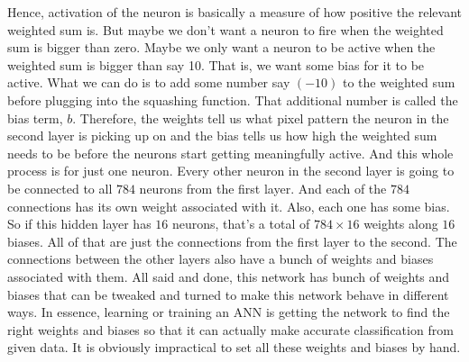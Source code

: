 \documentclass[master]{thesis-uestc}
\begin{document}
Hence, activation of the neuron is basically a measure of how positive the relevant weighted sum is. But maybe we don't want a neuron to fire when the weighted sum is bigger than zero. Maybe we only want a neuron to be active when the weighted sum is bigger than say 10. That is, we want some bias for it to be active. What we can do is to add some number say $(-10)$ to the weighted sum before plugging into the squashing function. That additional number is called the bias term, $b$. Therefore, the weights tell us what pixel pattern the neuron in the second layer is picking up on and the bias tells us how high the weighted sum needs to be before the neurons start getting meaningfully active. And this whole process is for just one neuron. Every other neuron in the second layer is going to be connected to all $784$ neurons from the first layer. And each of the $784$ connections has its own weight associated with it. Also, each one has some bias. So if this hidden layer has $16$ neurons, that's a total of $784 \times 16$ weights along $16$ biases. All of that are just the connections from the first layer to the second. The connections between the other layers also have a bunch of weights and biases associated with them. All said and done, this network has bunch of weights and biases that can be tweaked and turned to make this network behave in different ways. In essence, learning or training an ANN is getting the network to find the right weights and biases so that it can actually make accurate classification from given data. It is obviously impractical to set all these weights and biases by hand.
\end{document}
